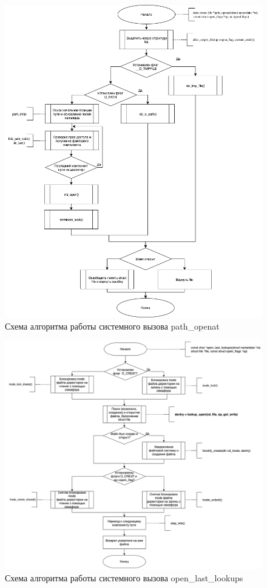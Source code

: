 \documentclass[12pt]{report}
\begin{document}
\begin{figure}[h!]
            \centering
            \includegraphics[scale=0.6]{path_openat.png}
            \caption{Схема алгоритма работы системного вызова path\_openat}
            \label{png:testing:result}
\end{figure}

\begin{figure}[h!]
            \centering
            \includegraphics[scale=0.4]{open_last_lookups.png}
            \caption{Схема алгоритма работы системного вызова open\_last\_lookups}
            \label{png:testing:result}
\end{figure}
\end{document}
